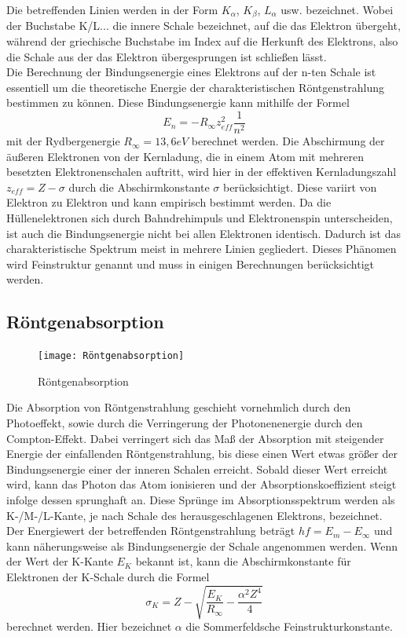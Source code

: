 Die betreffenden Linien werden in der Form $K_\alpha$, $K_\beta$, $L_\alpha$ usw. bezeichnet. Wobei der Buchstabe K/L... die innere Schale bezeichnet, auf die das Elektron übergeht, während der griechische Buchstabe im Index auf die Herkunft des Elektrons, also die Schale aus der das Elektron übergesprungen ist schließen lässt. \\
Die Berechnung der Bindungsenergie eines Elektrons auf der n-ten Schale ist essentiell um die theoretische Energie der charakteristischen Röntgenstrahlung bestimmen zu können. Diese Bindungsenergie kann mithilfe der Formel
\begin{equation}
E_n=-R_{\infty}z_{eff}^2\frac{1}{n^2}
\end{equation}
mit der Rydbergenergie $R_{\infty}=13,6 eV$ berechnet werden. Die Abschirmung der äußeren Elektronen von der Kernladung, die in einem Atom mit mehreren besetzten Elektronenschalen auftritt, wird hier in der effektiven Kernladungszahl $z_{eff}=Z-\sigma$ durch die Abschirmkonstante $\sigma$ berücksichtigt. Diese variirt von Elektron zu Elektron und kann empirisch bestimmt werden.
Da die Hüllenelektronen sich durch Bahndrehimpuls und Elektronenspin unterscheiden, ist auch die Bindungsenergie nicht bei allen Elektronen identisch. Dadurch ist das charakteristische Spektrum meist in mehrere Linien gegliedert. Dieses Phänomen wird Feinstruktur genannt und muss in einigen Berechnungen berücksichtigt werden.
\subsection{Röntgenabsorption}
\begin{figure}[h]
    \centering
    \texttt{[image: Röntgenabsorption]}
    \caption{Röntgenabsorption}
\end{figure}
Die Absorption von Röntgenstrahlung geschieht vornehmlich durch den Photoeffekt, sowie durch die Verringerung der Photonenenergie durch den Compton-Effekt. Dabei verringert sich das Maß der Absorption mit steigender Energie der einfallenden Röntgenstrahlung, bis diese einen Wert etwas größer der Bindungsenergie einer der inneren Schalen erreicht. Sobald dieser Wert erreicht wird, kann das Photon das Atom ionisieren und der Absorptionskoeffizient steigt infolge dessen sprunghaft an.
Diese Sprünge im Absorptionsspektrum werden als K-/M-/L-Kante, je nach Schale des herausgeschlagenen Elektrons, bezeichnet. Der Energiewert der betreffenden Röntgenstrahlung beträgt $hf=E_m-E_{\infty}$ und kann näherungsweise als Bindungsenergie der Schale angenommen werden. 
Wenn der Wert der K-Kante $E_K$ bekannt ist, kann die Abschirmkonstante für Elektronen der K-Schale durch die Formel
\begin{equation}
\sigma_K=Z-\sqrt{\frac{E_K}{R_{\infty}}-\frac{\alpha^2Z^4}{4}}
\end{equation}
berechnet werden. Hier bezeichnet $\alpha$ die Sommerfeldsche Feinstrukturkonstante. 
